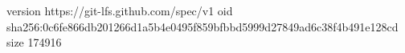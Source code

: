 version https://git-lfs.github.com/spec/v1
oid sha256:0c6fe866db201266d1a5b4e0495f859bfbbd5999d27849ad6c38f4b491e128cd
size 174916
